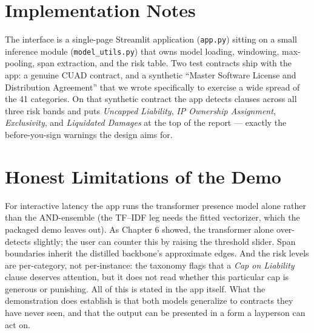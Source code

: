 \section{Implementation Notes}
The interface is a single-page Streamlit application (\texttt{app.py}) sitting on a small inference module (\texttt{model\_utils.py}) that owns model loading, windowing, max-pooling, span extraction, and the risk table. Two test contracts ship with the app: a genuine CUAD contract, and a synthetic ``Master Software License and Distribution Agreement'' that we wrote specifically to exercise a wide spread of the 41 categories. On that synthetic contract the app detects clauses across all three risk bands and puts \emph{Uncapped Liability}, \emph{IP Ownership Assignment}, \emph{Exclusivity}, and \emph{Liquidated Damages} at the top of the report --- exactly the before-you-sign warnings the design aims for.

\section{Honest Limitations of the Demo}
For interactive latency the app runs the transformer presence model alone rather than the AND-ensemble (the TF--IDF leg needs the fitted vectorizer, which the packaged demo leaves out). As Chapter 6 showed, the transformer alone over-detects slightly; the user can counter this by raising the threshold slider. Span boundaries inherit the distilled backbone's approximate edges. And the risk levels are per-category, not per-instance: the taxonomy flags that a \emph{Cap on Liability} clause deserves attention, but it does not read whether this particular cap is generous or punishing. All of this is stated in the app itself. What the demonstration does establish is that both models generalize to contracts they have never seen, and that the output can be presented in a form a layperson can act on.
